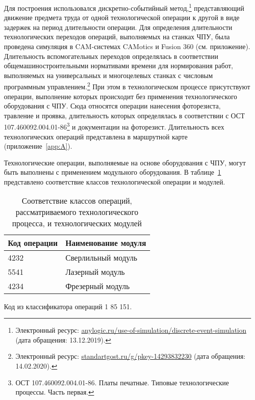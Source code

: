 Для построения использовался дискретно-событийный метод,\footnote{Электронный ресурс: {\tiny\url{anylogic.ru/use-of-simulation/discrete-event-simulation}} (дата обращения: 13.12.2019).} представляющий движение предмета труда от одной технологической операции к другой в виде задержек на период длительности операции. Для определения длительности технологических переходов операций, выполняемых на станках ЧПУ, была проведена симуляция в CAM-системах CAMotics и Fusion 360 (см. приложение). Длительность вспомогательных переходов определялась в соответствии общемашиностроительными нормативами времени для нормирования работ, выполняемых на универсальных и многоцелевых станках с числовым программным управлением.\footnote{Электронный ресурс: \url{standartgost.ru/g/pkey-14293832230} (дата обращения: 14.02.2020).} При этом в технологическом процессе присутствуют операции, выполнение которых происходит без применения технологического оборудования с ЧПУ. Сюда относятся операции нанесения фоторезиста, травление и проявка, длительность которых определялась в соответствии с ОСТ 107.460092.004.01-86\footnote{ОСТ 107.460092.004.01-86. Платы печатные. Типовые технологические процессы. Часть первая.} и документации на фоторезист. Длительность всех технологических операций представлена в маршрутной карте (приложение~\cref{app:A}).

Технологические операции, выполняемые на основе оборудования с ЧПУ, могут быть выполнены с применением модульного оборудования. В таблице~\cref{tab:cnc-modules} представлено соответствие классов технологической операции и модулей.

\begin{table} [!htb]
	\centering
	\caption{Соответствие классов операций, рассматриваемого технологического процесса, и технологических модулей} \vspace{4pt}
	\label{tab:cnc-modules}
	\begin{threeparttable}
		\begin{tabularx}{\linewidth}{ll}
			\toprule
			\textbf{Код операции\tnote{1}} & \textbf{Наименование модуля} \\
			\midrule
			4232 & Сверлильный модуль \\
			5541 & Лазерный модуль \\
			4234 & Фрезерный модуль \\
			\bottomrule
		\end{tabularx}
		\begin{tablenotes} \footnotesize
			\item [1] Код из классификатора операций 1 85 151.
		\end{tablenotes}
	\end{threeparttable}
\end{table}

